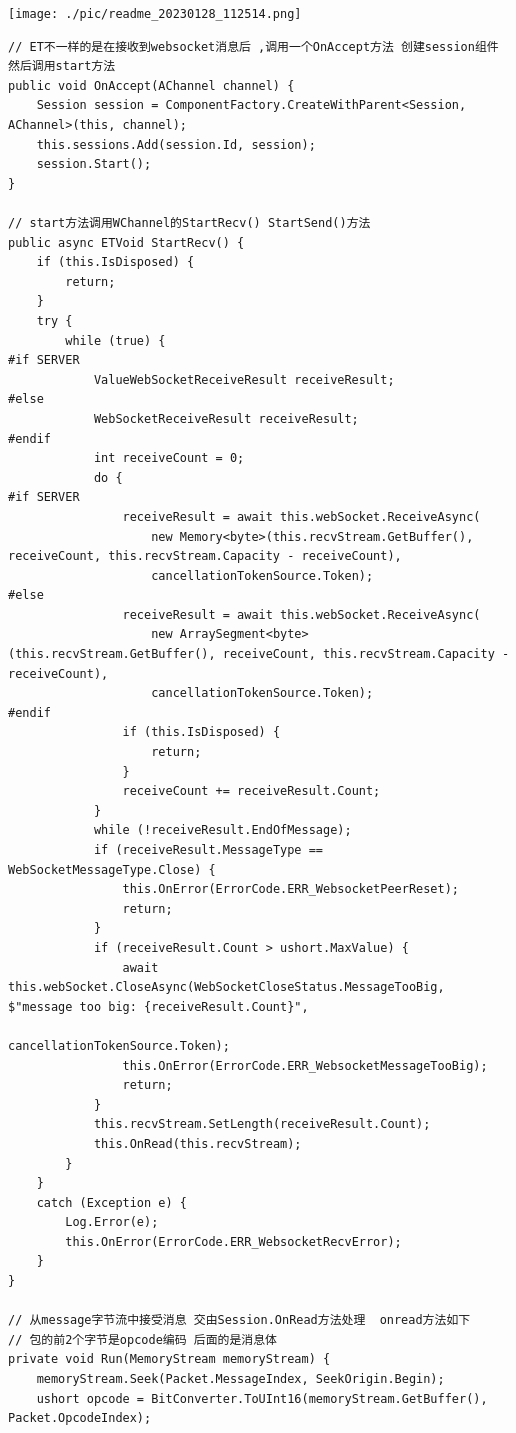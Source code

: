 \documentclass[9pt, b5paper]{article}
\begin{document}
\texttt{[image: ./pic/readme\_20230128\_112514.png]}

\begin{verbatim}
// ET不一样的是在接收到websocket消息后 ,调用一个OnAccept方法 创建session组件 然后调用start方法
public void OnAccept(AChannel channel) {
    Session session = ComponentFactory.CreateWithParent<Session, AChannel>(this, channel);
    this.sessions.Add(session.Id, session);
    session.Start();
}

// start方法调用WChannel的StartRecv() StartSend()方法
public async ETVoid StartRecv() {
    if (this.IsDisposed) {
        return;
    }
    try {
        while (true) {
#if SERVER
            ValueWebSocketReceiveResult receiveResult;
#else
            WebSocketReceiveResult receiveResult;
#endif
            int receiveCount = 0;
            do {
#if SERVER
                receiveResult = await this.webSocket.ReceiveAsync(
                    new Memory<byte>(this.recvStream.GetBuffer(), receiveCount, this.recvStream.Capacity - receiveCount),
                    cancellationTokenSource.Token);
#else
                receiveResult = await this.webSocket.ReceiveAsync(
                    new ArraySegment<byte>(this.recvStream.GetBuffer(), receiveCount, this.recvStream.Capacity - receiveCount),
                    cancellationTokenSource.Token);
#endif
                if (this.IsDisposed) {
                    return;
                }
                receiveCount += receiveResult.Count;
            }
            while (!receiveResult.EndOfMessage);
            if (receiveResult.MessageType == WebSocketMessageType.Close) {
                this.OnError(ErrorCode.ERR_WebsocketPeerReset);
                return;
            }
            if (receiveResult.Count > ushort.MaxValue) {
                await this.webSocket.CloseAsync(WebSocketCloseStatus.MessageTooBig, $"message too big: {receiveResult.Count}",
                                                cancellationTokenSource.Token);
                this.OnError(ErrorCode.ERR_WebsocketMessageTooBig);
                return;
            }
            this.recvStream.SetLength(receiveResult.Count);
            this.OnRead(this.recvStream);
        }
    }
    catch (Exception e) {
        Log.Error(e);
        this.OnError(ErrorCode.ERR_WebsocketRecvError);
    }
}

// 从message字节流中接受消息 交由Session.OnRead方法处理  onread方法如下
// 包的前2个字节是opcode编码 后面的是消息体
private void Run(MemoryStream memoryStream) {
    memoryStream.Seek(Packet.MessageIndex, SeekOrigin.Begin);
    ushort opcode = BitConverter.ToUInt16(memoryStream.GetBuffer(), Packet.OpcodeIndex);
            

\end{verbatim}
\end{document}
